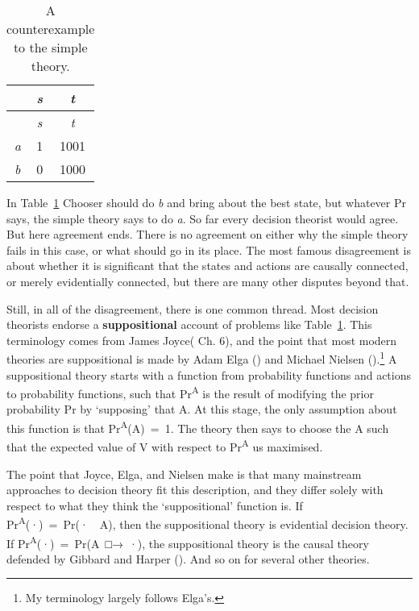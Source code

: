 \documentclass[
  10pt,
  letterpaper,
  DIV=11,
  numbers=noendperiod,
  twoside]{scrartcl}
\begin{document}
\begin{longtable}[]{@{}ccc@{}}
\caption{A counterexample to the simple
theory.}\label{tbl-joycewindow}\tabularnewline
\toprule\noalign{}
& \emph{s} & \emph{t} \\
\midrule\noalign{}
\endfirsthead
\toprule\noalign{}
& \emph{s} & \emph{t} \\
\midrule\noalign{}
\endhead
\bottomrule\noalign{}
\endlastfoot
\emph{a} & 1 & 1001 \\
\emph{b} & 0 & 1000 \\
\end{longtable}

In Table~\ref{tbl-joycewindow} Chooser should do \emph{b} and bring
about the best state, but whatever Pr says, the simple theory says to do
\emph{a}. So far every decision theorist would agree. But here agreement
ends. There is no agreement on either why the simple theory fails in
this case, or what should go in its place. The most famous disagreement
is about whether it is significant that the states and actions are
causally connected, or merely evidentially connected, but there are many
other disputes beyond that.

Still, in all of the disagreement, there is one common thread. Most
decision theorists endorse a \textbf{suppositional} account of problems
like Table~\ref{tbl-joycewindow}. This terminology comes from James
Joyce( Ch. 6), and the point that most
modern theories are suppositional is made by Adam Elga
() and Michael Nielsen
().\footnote{My terminology largely
  follows Elga's.} A suppositional theory starts with a function from
probability functions and actions to probability functions, such that
Pr\textsuperscript{A} is the result of modifying the prior probability
Pr by `supposing' that A. At this stage, the only assumption about this
function is that Pr\textsuperscript{A}(A)~=~1. The theory then says to
choose the A such that the expected value of V with respect to
Pr\textsuperscript{A} us maximised.

The point that Joyce, Elga, and Nielsen make is that many mainstream
approaches to decision theory fit this description, and they differ
solely with respect to what they think the `suppositional' function is.
If Pr\textsuperscript{A}(·)~=~Pr(·~\textbar~A), then the suppositional
theory is evidential decision theory. If
Pr\textsuperscript{A}(·)~=~Pr(A~□→~·), the suppositional theory is the
causal theory defended by Gibbard and Harper
(). And so on for several other
theories.
\end{document}
